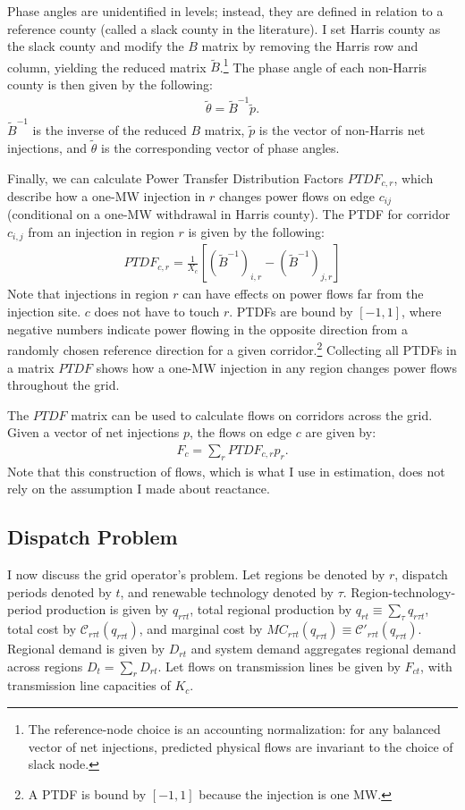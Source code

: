 \documentclass[12pt]{article}
\begin{document}
Phase angles are unidentified in levels; instead, they are defined in relation to a reference county (called a slack county in the literature). I set Harris county as the slack county and modify the $B$ matrix by removing the Harris row and column, yielding the reduced matrix $\widetilde{B}$.\footnote{The reference-node choice is an accounting normalization: for any balanced vector of net injections, predicted physical flows are invariant to the choice of slack node.} The phase angle of each non-Harris county is then given by the following:
\begin{align}
    \widetilde{\theta} = \widetilde{B}^{-1} \widetilde{p}.
\end{align}
$\widetilde{B}^{-1}$ is the inverse of the reduced $B$ matrix, $\widetilde{p}$ is the vector of non-Harris net injections, and $\widetilde{\theta}$ is the corresponding vector of phase angles. 

Finally, we can calculate Power Transfer Distribution Factors $PTDF_{c,r}$, which describe how a one-MW injection in $r$ changes power flows on edge $c_{ij}$ (conditional on a one-MW withdrawal in Harris county). The PTDF for corridor $c_{i,j}$ from an injection in region $r$ is given by the following:
\begin{align}
    PTDF_{c,r} = \frac{1}{X_c}[(\widetilde{B}^{-1})_{i,r} - (\widetilde{B}^{-1})_{j,r}]
\end{align}
Note that injections in region $r$ can have effects on power flows far from the injection site. $c$ does not have to touch $r$. PTDFs are bound by $[-1,1]$, where negative numbers indicate power flowing in the opposite direction from a randomly chosen reference direction for a given corridor.\footnote{A PTDF is bound by $[-1,1]$ because the injection is one MW.} Collecting all PTDFs in a matrix $PTDF$ shows how a one-MW injection in any region changes power flows throughout the grid.

The $PTDF$ matrix can be used to calculate flows on corridors across the grid. Given a vector of net injections $p$, the flows on edge $c$ are given by:
\begin{align}
    F_c = \sum_r PTDF_{c,r} p_r.
\end{align}
Note that this construction of flows, which is what I use in estimation, does not rely on the assumption I made about reactance.

\subsection{Dispatch Problem}
\label{sec:dispatch_problem}
I now discuss the grid operator's problem. Let regions be denoted by $r$, dispatch periods denoted by $t$, and renewable technology denoted by $\tau$. Region-technology-period production is given by $q_{r\tau t}$, total regional production by $q_{rt} \equiv \sum_\tau q_{r\tau t}$, total cost by $\mathcal{C}_{r\tau t}(q_{r\tau t})$, and marginal cost by $MC_{r\tau t}(q_{r\tau t}) \equiv \mathcal{C}'_{r\tau t}(q_{r\tau t})$. Regional demand is given by $D_{rt}$ and system demand aggregates regional demand across regions $D_t = \sum_r D_{rt}$. Let flows on transmission lines be given by $F_{ct}$, with transmission line capacities of $K_c$. 
\end{document}
